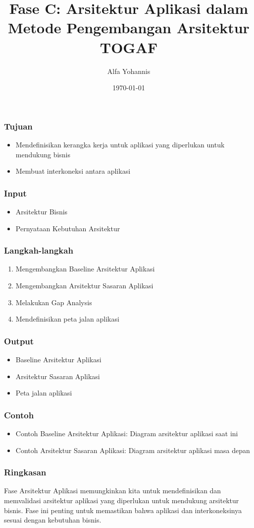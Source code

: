 \documentclass{beamer}
\title{Fase C: Arsitektur Aplikasi dalam Metode Pengembangan Arsitektur TOGAF}
\author{Alfa Yohannis}
\date{\today}
\begin{document}
\frame{\titlepage}

\begin{frame}
\frametitle{Tujuan}
\begin{itemize}
\item Mendefinisikan kerangka kerja untuk aplikasi yang diperlukan untuk mendukung bisnis
\item Membuat interkoneksi antara aplikasi
\end{itemize}
\end{frame}

\begin{frame}
\frametitle{Input}
\begin{itemize}
\item Arsitektur Bisnis
\item Pernyataan Kebutuhan Arsitektur
\end{itemize}
\end{frame}

\begin{frame}
\frametitle{Langkah-langkah}
\begin{enumerate}
\item Mengembangkan Baseline Arsitektur Aplikasi
\item Mengembangkan Arsitektur Sasaran Aplikasi
\item Melakukan Gap Analysis
\item Mendefinisikan peta jalan aplikasi
\end{enumerate}
\end{frame}

\begin{frame}
\frametitle{Output}
\begin{itemize}
\item Baseline Arsitektur Aplikasi
\item Arsitektur Sasaran Aplikasi
\item Peta jalan aplikasi
\end{itemize}
\end{frame}

\begin{frame}
\frametitle{Contoh}
\begin{itemize}
\item Contoh Baseline Arsitektur Aplikasi: Diagram arsitektur aplikasi saat ini
\item Contoh Arsitektur Sasaran Aplikasi: Diagram arsitektur aplikasi masa depan
\end{itemize}
\end{frame}

\begin{frame}
\frametitle{Ringkasan}
Fase Arsitektur Aplikasi memungkinkan kita untuk mendefinisikan dan memvalidasi arsitektur aplikasi yang diperlukan untuk mendukung arsitektur bisnis. Fase ini penting untuk memastikan bahwa aplikasi dan interkoneksinya sesuai dengan kebutuhan bisnis.
\end{frame}
\end{document}
